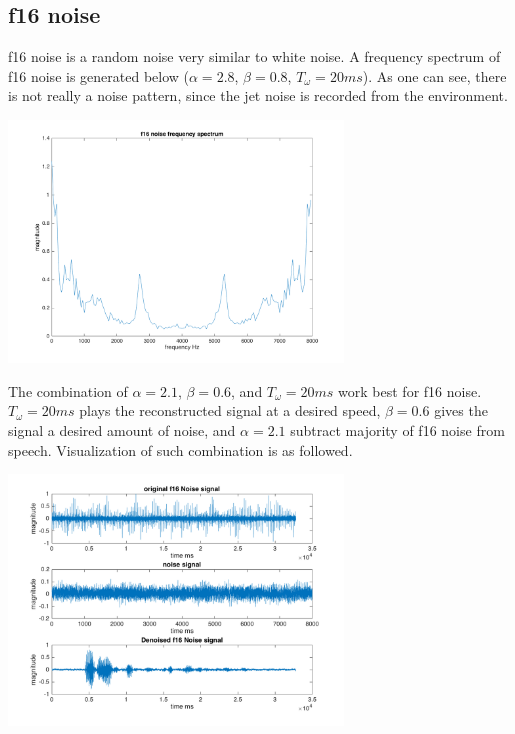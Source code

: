 \documentclass[journal]{IEEEtran}
\begin{document}
\subsection{f16 noise}
\begin{flushleft}
f16 noise is a random noise very similar to white noise. A frequency spectrum of f16 noise is generated below ($\alpha = 2.8$, $\beta = 0.8$, $T_\omega = 20ms$). As one can see, there is not really a noise pattern, since the jet noise is recorded from the environment. 
\end{flushleft}
\centering 
\includegraphics[width=3.5in]{f16noise_log}
\begin{flushleft}
The combination of $\alpha = 2.1$, $\beta = 0.6$, and $T_\omega = 20ms$ work best for f16 noise. $T_\omega = 20ms$ plays the reconstructed signal at a desired speed, $\beta = 0.6$ gives the signal a desired amount of noise, and $\alpha = 2.1$ subtract majority of f16 noise from speech. Visualization of such combination is as followed. 
\end{flushleft}
\centering 
\includegraphics[width=3.5in]{f16Noise}
\end{document}
